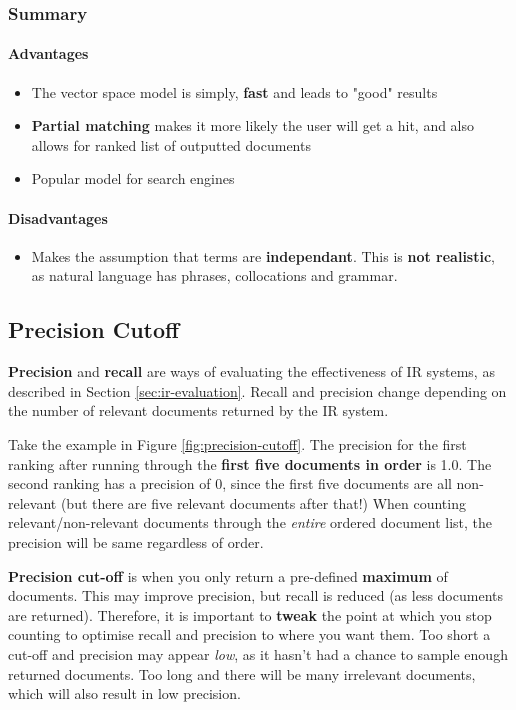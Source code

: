 \documentclass{article}
\begin{document}
\subsubsection{Summary}

\paragraph{\textbf{Advantages}}
\begin{itemize}
	\item The vector space model is simply, \textbf{fast} and leads to "good" results
	\item \textbf{Partial matching} makes it more likely the user will get a hit, and also allows for ranked list of outputted documents
	\item Popular model for search engines
\end{itemize}
\paragraph{\textbf{Disadvantages}}
\begin{itemize}
	\item Makes the assumption that terms are \textbf{independant}. This is \textbf{not realistic}, as natural language has phrases, collocations and grammar.
\end{itemize}

\subsection{Precision Cutoff}

\textbf{Precision} and \textbf{recall} are ways of evaluating the effectiveness of IR systems, as described in Section \ref{sec:ir-evaluation}. Recall and precision change depending on the number of relevant documents returned by the IR system.

Take the example in Figure \ref{fig:precision-cutoff}. The precision for the first ranking after running through the \textbf{first five documents in order} is 1.0. The second ranking has a precision of 0, since the first five documents are all non-relevant (but there are five relevant documents after that!) When counting relevant/non-relevant documents through the \textit{entire} ordered document list, the precision will be same regardless of order.

\textbf{Precision cut-off} is when you only return a pre-defined \textbf{maximum} of documents. This may improve precision, but recall is reduced (as less documents are returned). Therefore, it is important to \textbf{tweak} the point at which you stop counting to optimise recall and precision to where you want them. Too short a cut-off and precision may appear \textit{low}, as it hasn't had a chance to sample enough returned documents. Too long and there will be many irrelevant documents, which will also result in low precision.
\end{document}

